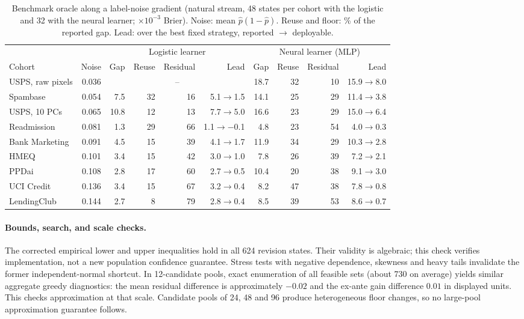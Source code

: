 \documentclass[runningheads]{llncs}
\begin{document}
\begin{table}[t]
\caption{Benchmark oracle along a label-noise gradient (natural stream, 48 states per cohort with the logistic and 32 with the neural learner; $\times10^{-3}$ Brier). Noise: mean $\hat p(1-\hat p)$. Reuse and floor: \% of the reported gap. Lead: over the best fixed strategy, reported $\to$ deployable.}
\label{tab:gradient}
\centering\scriptsize
\setlength{\tabcolsep}{2.6pt}
\begin{tabular}{lrrrrrrrrr}
\toprule
& & \multicolumn{4}{c}{Logistic learner} & \multicolumn{4}{c}{Neural learner (MLP)} \\
\cmidrule(lr){3-6}\cmidrule(lr){7-10}
Cohort & Noise & Gap & Reuse & Residual & Lead & Gap & Reuse & Residual & Lead \\
\midrule
USPS, raw pixels & 0.036 & \multicolumn{4}{c}{--} & 18.7 & 32 & 10 & 15.9$\to$8.0 \\
Spambase & 0.054 & 7.5 & 32 & 16 & 5.1$\to$1.5 & 14.1 & 25 & 29 & 11.4$\to$3.8 \\
USPS, 10 PCs & 0.065 & 10.8 & 12 & 13 & 7.7$\to$5.0 & 16.6 & 23 & 29 & 15.0$\to$6.4 \\
Readmission & 0.081 & 1.3 & 29 & 66 & 1.1$\to$$-$0.1 & 4.8 & 23 & 54 & 4.0$\to$0.3 \\
Bank Marketing & 0.091 & 4.5 & 15 & 39 & 4.1$\to$1.7 & 11.9 & 34 & 29 & 10.3$\to$2.8 \\
HMEQ & 0.101 & 3.4 & 15 & 42 & 3.0$\to$1.0 & 7.8 & 26 & 39 & 7.2$\to$2.1 \\
PPDai & 0.108 & 2.8 & 17 & 60 & 2.7$\to$0.5 & 10.4 & 20 & 38 & 9.1$\to$3.0 \\
UCI Credit & 0.136 & 3.4 & 15 & 67 & 3.2$\to$0.4 & 8.2 & 47 & 38 & 7.8$\to$0.8 \\
LendingClub & 0.144 & 2.7 & 8 & 79 & 2.8$\to$0.4 & 8.5 & 39 & 53 & 8.6$\to$0.7 \\
\bottomrule
\end{tabular}
\end{table}

\paragraph{Bounds, search, and scale checks.} The corrected empirical lower and upper inequalities hold in all 624 revision states. Their validity is algebraic; this check verifies implementation, not a new population confidence guarantee. Stress tests with negative dependence, skewness and heavy tails invalidate the former independent-normal shortcut. In 12-candidate pools, exact enumeration of all feasible sets (about 730 on average) yields similar aggregate greedy diagnostics: the mean residual difference is approximately $-0.02$ and the ex-ante gain difference $0.01$ in displayed units. This checks approximation at that scale. Candidate pools of 24, 48 and 96 produce heterogeneous floor changes, so no large-pool approximation guarantee follows.
\end{document}
